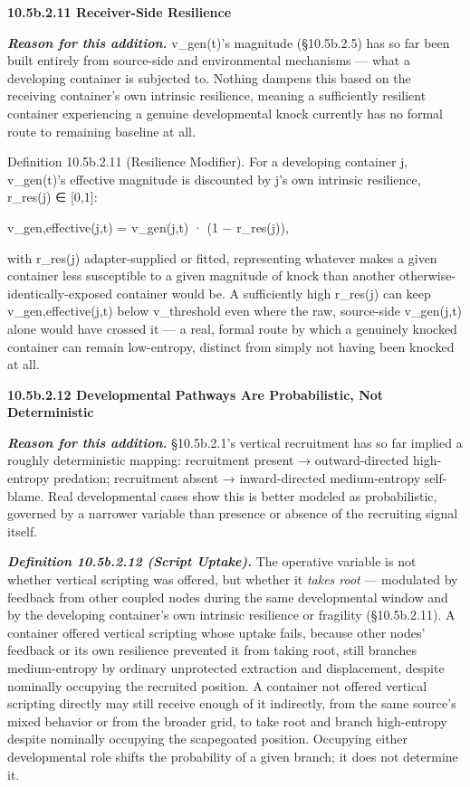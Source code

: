 \documentclass[
]{article}
\begin{document}
\textbf{10.5b.2.11 Receiver-Side Resilience}

\emph{\textbf{Reason for this addition.}} v\_gen(t)'s magnitude
(§10.5b.2.5) has so far been built entirely from source-side and
environmental mechanisms --- what a developing container is subjected
to. Nothing dampens this based on the receiving container's own
intrinsic resilience, meaning a sufficiently resilient container
experiencing a genuine developmental knock currently has no formal route
to remaining baseline at all.

Definition 10.5b.2.11 (Resilience Modifier). For a developing container
j, v\_gen(t)'s effective magnitude is discounted by j's own intrinsic
resilience, r\_res(j) ∈ {[}0,1{]}:

v\_gen,effective(j,t) = v\_gen(j,t) · (1 − r\_res(j)),

with r\_res(j) adapter-supplied or fitted, representing whatever makes a
given container less susceptible to a given magnitude of knock than
another otherwise-identically-exposed container would be. A sufficiently
high r\_res(j) can keep v\_gen,effective(j,t) below v\_threshold even
where the raw, source-side v\_gen(j,t) alone would have crossed it --- a
real, formal route by which a genuinely knocked container can remain
low-entropy, distinct from simply not having been knocked at all.

\textbf{10.5b.2.12 Developmental Pathways Are Probabilistic, Not
Deterministic}

\emph{\textbf{Reason for this addition.}} §10.5b.2.1's vertical
recruitment has so far implied a roughly deterministic mapping:
recruitment present → outward-directed high-entropy predation;
recruitment absent → inward-directed medium-entropy self-blame. Real
developmental cases show this is better modeled as probabilistic,
governed by a narrower variable than presence or absence of the
recruiting signal itself.

\emph{\textbf{Definition 10.5b.2.12 (Script Uptake).}} The operative
variable is not whether vertical scripting was offered, but whether
it \emph{takes root} --- modulated by feedback from other coupled nodes
during the same developmental window and by the developing container's
own intrinsic resilience or fragility (§10.5b.2.11). A container offered
vertical scripting whose uptake fails, because other nodes' feedback
or its own resilience prevented it from taking root, still branches
medium-entropy by ordinary unprotected extraction and displacement,
despite nominally occupying the recruited position. A container not
offered vertical scripting directly may still receive enough of it
indirectly, from the same source's mixed behavior or from the broader
grid, to take root and branch high-entropy despite nominally occupying
the scapegoated position. Occupying either developmental role shifts the
probability of a given branch; it does not determine it.
\end{document}

